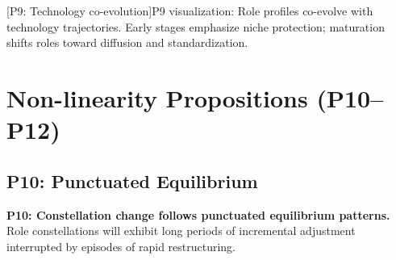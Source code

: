 \documentclass[../main.tex]{subfiles}
\begin{document}
\begin{center}
[P9: Technology co-evolution]{P9 visualization: Role profiles co-evolve with technology trajectories. Early stages emphasize niche protection; maturation shifts roles toward diffusion and standardization.}
\end{center}


\section{Non-linearity Propositions (P10--P12)}

\subsection{P10: Punctuated Equilibrium}

\begin{propositionbox}
\textbf{P10: Constellation change follows punctuated equilibrium patterns.}\\[3pt]
Role constellations will exhibit long periods of incremental adjustment interrupted by episodes of rapid restructuring.
\end{propositionbox}
\end{document}

